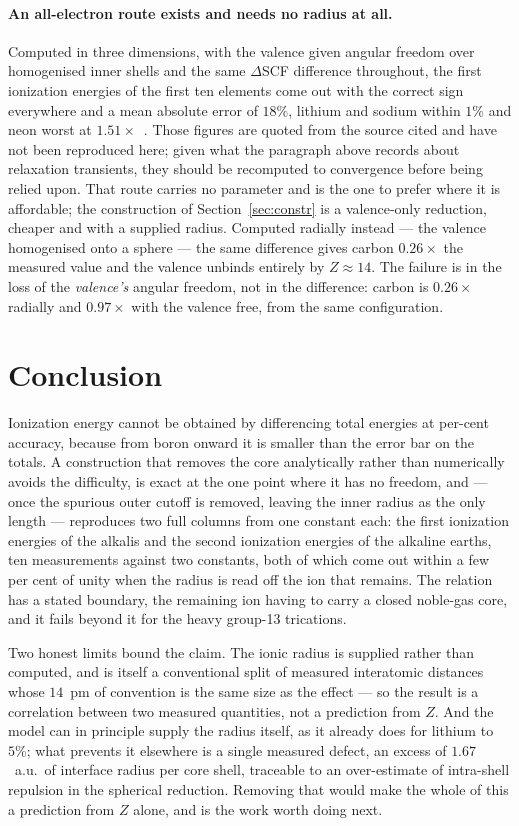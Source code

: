 \documentclass[11pt]{article}
\begin{document}
\paragraph{An all-electron route exists and needs no radius at all.} Computed in three
dimensions, with the valence given angular freedom over homogenised inner shells and the same
$\Delta$SCF difference throughout, the first ionization energies of the first ten elements
come out with the correct sign everywhere and a mean absolute error of $18\%$, lithium and
sodium within $1\%$ and neon worst at $1.51\times$~\cite{Johnson-blog3D}. Those figures are
quoted from the source cited and have not been reproduced here; given what the paragraph above
records about relaxation transients, they should be recomputed to convergence before being
relied upon. That route carries
no parameter and is the one to prefer where it is affordable; the construction of
Section~\ref{sec:constr} is a valence-only reduction, cheaper and with a supplied radius.
Computed radially instead --- the valence homogenised onto a sphere --- the same difference
gives carbon $0.26\times$ the measured value and the valence unbinds entirely by
$Z\approx14$. The failure is in the loss of the \emph{valence's} angular freedom, not in the
difference: carbon is $0.26\times$ radially and $0.97\times$ with the valence free, from the
same configuration.

\section{Conclusion}

Ionization energy cannot be obtained by differencing total energies at per-cent accuracy,
because from boron onward it is smaller than the error bar on the totals. A construction that
removes the core analytically rather than numerically avoids the difficulty, is exact at the
one point where it has no freedom, and --- once the spurious outer cutoff is removed, leaving
the inner radius as the only length --- reproduces two full columns from one constant each: the
first ionization energies of the alkalis and the second ionization energies of the alkaline
earths, ten measurements against two constants, both of which come out within a few per cent of
unity when the radius is read off the ion that remains. The relation has a stated boundary, the
remaining ion having to carry a closed noble-gas core, and it fails beyond it for the heavy
group-13 trications.

Two honest limits bound the claim. The ionic radius is supplied rather than computed, and is
itself a conventional split of measured interatomic distances whose $14$~pm of convention is
the same size as the effect --- so the result is a correlation between two measured quantities,
not a prediction from $Z$. And the model can in principle supply the radius itself, as it
already does for lithium to $5\%$; what prevents it elsewhere is a single measured defect, an
excess of $1.67$~a.u.\ of interface radius per core shell, traceable to an over-estimate of
intra-shell repulsion in the spherical reduction. Removing that would make the whole of this a
prediction from $Z$ alone, and is the work worth doing next.
\end{document}
